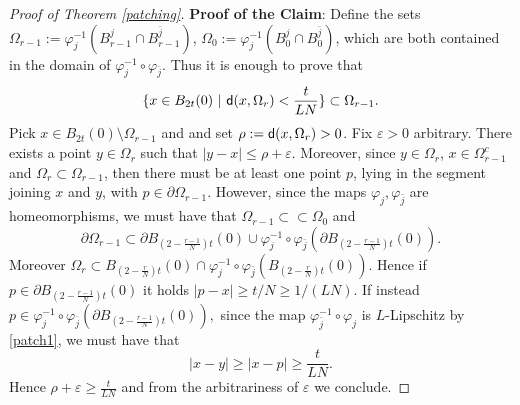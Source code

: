 \documentclass[11pt]{article}
\newcommand{\eps}{\varepsilon}
\newcommand{\sfd}{{\sf d}}
\renewcommand{\phi}{\varphi}
\theoremstyle{plain}
\theoremstyle{definition}
\numberwithin{equation}{section}
\begin{document}
\begin{proof}[Proof of Theorem \ref{patching}]
	\textbf{Proof of the Claim}: Define the sets $\Omega_{r-1}:=\phi_j^{-1}(B^j_{r-1}\cap B^{\bar j}_{r-1})$,  $\Omega_{0}:=\phi_j^{-1}(B^j_{0}\cap B^{\bar j}_{0})$, which are both contained in the domain of $\phi_j^{-1}\circ \phi_{\bar j}$. Thus it is enough to prove that 
	$$\{x \in B_{2t}(0) \ | \ \sfd(x,\Omega_r)<\frac{t}{LN}\}\subset \Omega_{r-1}.$$
	Pick $x \in B_{2t}(0) \setminus \Omega_{r-1}$ and and set $\rho:=\sfd(x,\Omega_r)>0$. Fix $\eps>0$ arbitrary. There exists a point $y \in \Omega_r$ such that $|y-x|\le \rho+\eps.$  Moreover, since $y \in \Omega_r$, $x \in \Omega_{r-1}^c$ and $\Omega_r \subset \Omega_{r-1}$, then there must be at least one point $p$, lying in the segment joining $x$ and $y$, with $p\in \partial \Omega_{r-1}$. However, since the maps $\phi_j,\phi_{\bar j}$ are homeomorphisms, we must have that $\Omega_{r-1}\subset \subset \Omega_0$ and 
	\[\partial \Omega_{r-1}\subset \partial B_{(2-\frac{r-1}{N})t}(0)\cup \phi_j^{-1}\circ \phi_{\bar j}(\partial B_{(2-\frac{r-1}{N})t}(0)). \]
	Moreover $\Omega_r\subset B_{(2-\frac{r}{N})t}(0)\cap \phi_j^{-1}\circ \phi_{\bar j}(B_{(2-\frac{r}{N})t}(0))$. Hence if $p \in \partial B_{(2-\frac{r-1}{N})t}(0)$ it holds $|p-x|\ge t/N\ge 1/(LN)$. If instead $p\in \phi_j^{-1}\circ \phi_{\bar j}(\partial B_{(2-\frac{r-1}{N})t}(0)),$ since the map $\phi_{\bar j}^{-1}\circ \phi_{j}$ is $L$-Lipschitz by \eqref{patch1}, we must have that
	\[|x-y|\ge|x-p|\ge \frac{t}{LN}.\]
	Hence $\rho+\eps \ge \frac{t}{LN}$ and from the arbitrariness of $\eps$ we conclude.
\end{proof}
\end{document}

